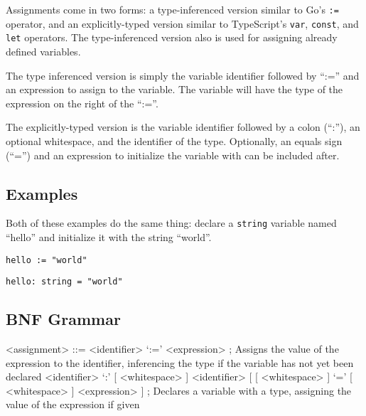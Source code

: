\documentclass[letterpaper,titlepage]{scrreprt}
\begin{document}
Assignments come in two forms: a type-inferenced version similar to Go's \lstinline{:=} operator, and an explicitly-typed version similar to TypeScript's \lstinline{var}, \lstinline{const}, and \lstinline{let} operators. The type-inferenced version also is used for assigning already defined variables.

The type inferenced version is simply the variable identifier followed by ``:='' and an expression to assign to the variable. The variable will have the type of the expression on the right of the ``:=''.

The explicitly-typed version is the variable identifier followed by a colon (``:''), an optional whitespace, and the identifier of the type. Optionally, an equals sign (``='') and an expression to initialize the variable with can be included after.

\subsection{Examples}
\label{subsec:AssignmentExamples}

Both of these examples do the same thing: declare a \lstinline{string} variable named ``hello'' and initialize it with the string ``world''.

\begin{lstlisting}[caption={Example type-inferenced assignment},label=lst:exampleinferenced]
hello := "world"	
\end{lstlisting}

\begin{lstlisting}[caption={Example explicitly-typed assignment},label=lst:exampleexplicit]
hello: string = "world"	
\end{lstlisting}


\subsection{BNF Grammar}
\label{subsec:AssignmentBNF}

\begin{grammar}

<assignment> ::= <identifier> `:=' <expression> ; Assigns the value of the expression to the identifier, inferencing the type if the variable has not yet been declared
\alt <identifier> `:' [ <whitespace> ] <identifier> [ [ <whitespace> ] `=' [ <whitespace> ] <expression> ] ; Declares a variable with a type, assigning the value of the expression if given

\end{grammar}
\end{document}
